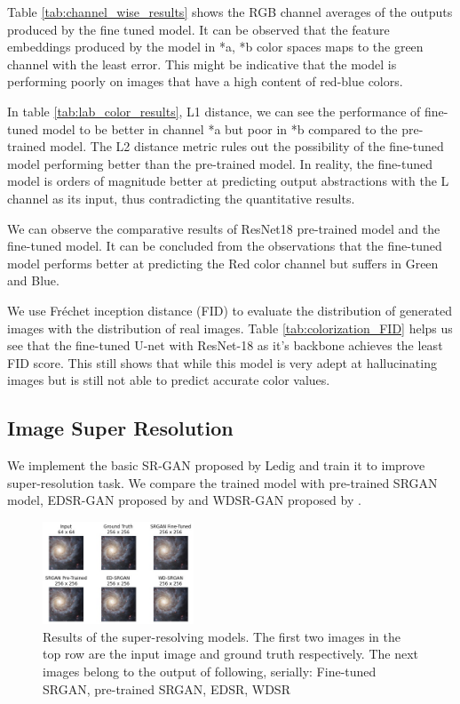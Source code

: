 \documentclass[conference]{IEEEtran}
\begin{document}


Table \ref{tab:channel_wise_results} shows the RGB channel averages of the outputs produced by the fine tuned model. It can be observed that the feature embeddings produced by the model in *a, *b color spaces maps to the green channel with the least error. This might be indicative that the model is performing poorly on images that have a high content of red-blue colors. 

 
In table \ref{tab:lab_color_results}, L1 distance, we can see the performance of fine-tuned model to be better in channel *a but poor in *b compared to the pre-trained model. The L2 distance metric rules out the possibility of the fine-tuned model performing better than the pre-trained model. In reality, the fine-tuned model is orders of magnitude better at predicting output abstractions with the L channel as its input, thus contradicting the quantitative results.


We can observe the comparative results of ResNet18 pre-trained model and the fine-tuned model. It can be concluded from the observations that the fine-tuned model performs better at predicting the Red color channel but suffers in Green and Blue.


We use Fréchet inception distance (FID) to evaluate the distribution of generated images with the distribution of real images. Table \ref{tab:colorization_FID} helps us see that the fine-tuned U-net with ResNet-18 as it's backbone achieves the least FID score. This still shows that while this model is very adept at hallucinating images but is still not able to predict accurate color values. 

\subsection{Image Super Resolution}
\hspace*{0.25 in}We implement the basic SR-GAN proposed by Ledig and train it to improve super-resolution task. We compare the trained model with pre-trained SRGAN model, EDSR-GAN proposed by \cite{lim2017enhanced} and WDSR-GAN proposed by \cite{yu2018wide}.

\begin{figure}[!htb]
	\includegraphics[width=0.4\textwidth]{figures/comparison_upscale}
	\caption{Results of the super-resolving models. The first two images in the top row are the input image and ground truth respectively. The next images belong to the output of following, serially: Fine-tuned SRGAN, pre-trained SRGAN, EDSR, WDSR}
	\label{fig: sr_results}
\end{figure}
\end{document}

